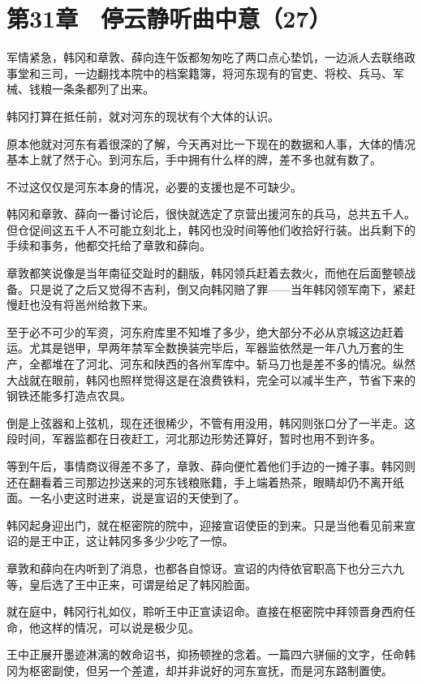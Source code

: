 \section{第31章　停云静听曲中意（27）}

军情紧急，韩冈和章敦、薛向连午饭都匆匆吃了两口点心垫饥，一边派人去联络政事堂和三司，一边翻找本院中的档案籍簿，将河东现有的官吏、将校、兵马、军械、钱粮一条条都列了出来。

韩冈打算在抵任前，就对河东的现状有个大体的认识。

原本他就对河东有着很深的了解，今天再对比一下现在的数据和人事，大体的情况基本上就了然于心。到河东后，手中拥有什么样的牌，差不多也就有数了。

不过这仅仅是河东本身的情况，必要的支援也是不可缺少。

韩冈和章敦、薛向一番讨论后，很快就选定了京营出援河东的兵马，总共五千人。但仓促间这五千人不可能立刻北上，韩冈也没时间等他们收拾好行装。出兵剩下的手续和事务，他都交托给了章敦和薛向。

章敦都笑说像是当年南征交趾时的翻版，韩冈领兵赶着去救火，而他在后面整顿战备。只是说了之后又觉得不吉利，倒又向韩冈赔了罪——当年韩冈领军南下，紧赶慢赶也没有将邕州给救下来。

至于必不可少的军资，河东府库里不知堆了多少，绝大部分不必从京城这边赶着运。尤其是铠甲，早两年禁军全数换装完毕后，军器监依然是一年八九万套的生产，全都堆在了河北、河东和陕西的各州军库中。斩马刀也是差不多的情况。纵然大战就在眼前，韩冈也照样觉得这是在浪费铁料，完全可以减半生产，节省下来的钢铁还能多打造点农具。

倒是上弦器和上弦机，现在还很稀少，不管有用没用，韩冈则张口分了一半走。这段时间，军器监都在日夜赶工，河北那边形势还算好，暂时也用不到许多。

等到午后，事情商议得差不多了，章敦、薛向便忙着他们手边的一摊子事。韩冈则还在翻看着三司那边抄送来的河东钱粮账籍，手上端着热茶，眼睛却仍不离开纸面。一名小吏这时进来，说是宣诏的天使到了。

韩冈起身迎出门，就在枢密院的院中，迎接宣诏使臣的到来。只是当他看见前来宣诏的是王中正，这让韩冈多多少少吃了一惊。

章敦和薛向在内听到了消息，也都各自惊讶。宣诏的内侍依官职高下也分三六九等，皇后选了王中正来，可谓是给足了韩冈脸面。

就在庭中，韩冈行礼如仪，聆听王中正宣读诏命。直接在枢密院中拜领晋身西府任命，他这样的情况，可以说是极少见。

王中正展开墨迹淋漓的敇命诏书，抑扬顿挫的念着。一篇四六骈俪的文字，任命韩冈为枢密副使，但另一个差遣，却并非说好的河东宣抚，而是河东路制置使。


